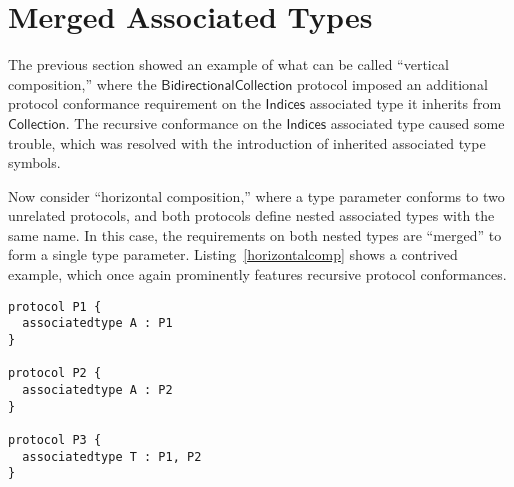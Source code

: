 \documentclass[a4paper,headsepline,bibliography=totoc,toc=flat,fleqn,twoside=semi]{scrbook}
\theoremstyle{definition}
\theoremstyle{definition}
\theoremstyle{definition}
\newcommand{\namesym}[1]{\mathsf{#1}}
\newcommand{\proto}[1]{\bm{\mathsf{#1}}}
\newcommand{\protosym}[1]{[\proto{#1}]}
\newcommand{\assocsym}[2]{[\proto{#1}\colon\namesym{#2}]}
\begin{document}
\begin{figure}
\begin{center}
\vspace{10mm}


\end{center}
\end{figure}

\section{Merged Associated Types}\label{mergedassoctypes}

The previous section showed an example of what can be called ``vertical composition,'' where the $\proto{BidirectionalCollection}$ protocol imposed an additional protocol conformance requirement on the $\namesym{Indices}$ associated type it inherits from $\proto{Collection}$. The recursive conformance on the $\namesym{Indices}$ associated type caused some trouble, which was resolved with the introduction of inherited associated type symbols.

Now consider ``horizontal composition,'' where a type parameter conforms to two unrelated protocols, and both protocols define nested associated types with the same name. In this case, the requirements on both nested types are ``merged'' to form a single type parameter. Listing~\ref{horizontalcomp} shows a contrived example, which once again prominently features recursive protocol conformances.
\begin{listing}\label{horizontalcomp}
\begin{Verbatim}
protocol P1 {
  associatedtype A : P1
}

protocol P2 {
  associatedtype A : P2
}

protocol P3 {
  associatedtype T : P1, P2
}
\end{Verbatim}
\end{listing}
\end{document}

